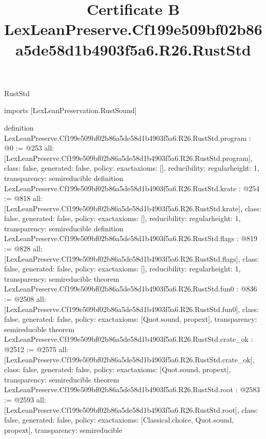 \begin{lexlean}{RustStd}
\title{Certificate B LexLeanPreserve.Cf199e509bf02b86a5de58d1b4903f5a6.R26.RustStd}
\begin{coremodule}
imports [LexLeanPreservation.RustSound]

definition LexLeanPreserve.Cf199e509bf02b86a5de58d1b4903f5a6.R26.RustStd.program : @0 := @253 {
  all: [LexLeanPreserve.Cf199e509bf02b86a5de58d1b4903f5a6.R26.RustStd.program],
  class: false,
  generated: false,
  policy: exact{axioms: []},
  reducibility: regular{height: 1},
  transparency: semireducible
}
definition LexLeanPreserve.Cf199e509bf02b86a5de58d1b4903f5a6.R26.RustStd.krate : @254 := @818 {
  all: [LexLeanPreserve.Cf199e509bf02b86a5de58d1b4903f5a6.R26.RustStd.krate],
  class: false,
  generated: false,
  policy: exact{axioms: []},
  reducibility: regular{height: 1},
  transparency: semireducible
}
definition LexLeanPreserve.Cf199e509bf02b86a5de58d1b4903f5a6.R26.RustStd.flags : @819 := @828 {
  all: [LexLeanPreserve.Cf199e509bf02b86a5de58d1b4903f5a6.R26.RustStd.flags],
  class: false,
  generated: false,
  policy: exact{axioms: []},
  reducibility: regular{height: 1},
  transparency: semireducible
}
theorem LexLeanPreserve.Cf199e509bf02b86a5de58d1b4903f5a6.R26.RustStd.fun0 : @836 := @2508 {
  all: [LexLeanPreserve.Cf199e509bf02b86a5de58d1b4903f5a6.R26.RustStd.fun0],
  class: false,
  generated: false,
  policy: exact{axioms: [Quot.sound, propext]},
  transparency: semireducible
}
theorem LexLeanPreserve.Cf199e509bf02b86a5de58d1b4903f5a6.R26.RustStd.crate_ok : @2512 := @2575 {
  all: [LexLeanPreserve.Cf199e509bf02b86a5de58d1b4903f5a6.R26.RustStd.crate_ok],
  class: false,
  generated: false,
  policy: exact{axioms: [Quot.sound, propext]},
  transparency: semireducible
}
theorem LexLeanPreserve.Cf199e509bf02b86a5de58d1b4903f5a6.R26.RustStd.root : @2583 := @2593 {
  all: [LexLeanPreserve.Cf199e509bf02b86a5de58d1b4903f5a6.R26.RustStd.root],
  class: false,
  generated: false,
  policy: exact{axioms: [Classical.choice, Quot.sound, propext]},
  transparency: semireducible
}


\end{coremodule}
\end{lexlean}
